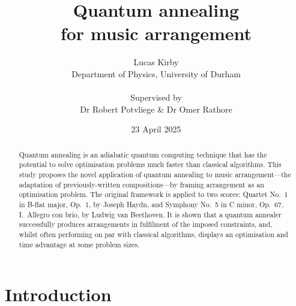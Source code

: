 \documentclass[12pt]{article}
\title{\Huge \bfseries Quantum annealing\\for music arrangement}
\author{Lucas Kirby\\\normalsize Department of Physics, University of Durham\\\\\normalsize Supervised by\\\normalsize Dr Robert Potvliege \& Dr Omer Rathore}
\date{\normalsize 23 April 2025}
\theoremstyle{definition}
\begin{document}
\maketitle

\vfill

\begin{abstract}              

Quantum annealing is an adiabatic quantum computing technique that has the potential to solve optimisation problems much faster than classical algorithms. This study proposes the novel application of quantum annealing to music arrangement---the adaptation of previously-written compositions---by framing arrangement as an optimisation problem. The original framework is applied to two scores: Quartet No.\ 1 in B-flat major, Op.\ 1, by
Joseph Haydn, and Symphony No.\ 5 in C minor, Op.\ 67,
I.\ Allegro con brio, by Ludwig van Beethoven. It is shown that a quantum annealer successfully produces arrangements in fulfilment of the imposed constraints, and, whilst often performing on par with classical algorithms, displays an optimisation and time advantage at some problem sizes.

\end{abstract}

\vfill

\begin{center}
    
\end{center}

\thispagestyle{empty}
\clearpage

\tableofcontents

\thispagestyle{empty}
\clearpage

\section{Introduction}
\end{document}
